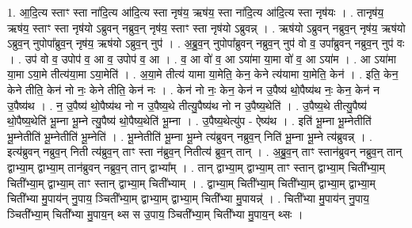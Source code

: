 \documentclass[17pt]{extarticle}
\begin{document}
1. आ॒दि॒त्य स्ताꣳ स्ता ना॑दि॒त्य आ॑दि॒त्य स्ता नृष॑य॒ ऋष॑य॒ स्ता ना॑दि॒त्य आ॑दि॒त्य स्ता नृष॑यः । . तानृष॑य॒ ऋष॑य॒ स्ताꣳ स्ता नृष॑यो ऽब्रुवन् नब्रुव॒न् नृष॑य॒ स्ताꣳ स्ता नृष॑यो ऽब्रुवन्न् । . ऋष॑यो ऽब्रुवन् नब्रुव॒न् नृष॑य॒ ऋष॑यो ऽब्रुव॒न् नुपोपा᳚ब्रुव॒न् नृष॑य॒ ऋष॑यो ऽब्रुव॒न् नुप॑ । . अ॒ब्रु॒व॒न् नुपोपा᳚ब्रुवन् नब्रुव॒न् नुप॑ वो व॒ उपा᳚ब्रुवन् नब्रुव॒न् नुप॑ वः । . उप॑ वो व॒ उपोप॑ व॒ आ व॒ उपोप॑ व॒ आ । . व॒ आ वो॑ व॒ आ ऽया॑मा या॒मा वो॑ व॒ आ ऽया॑म । . आ ऽया॑मा या॒मा ऽया॒मे तीत्य॑या॒मा ऽया॒मेति॑ । . अ॒या॒मे तीत्य॑ यामा या॒मेति॒ केन॒ केने त्य॑यामा या॒मेति॒ केन॑ । . इति॒ केन॒ केने तीति॒ केन॑ नो नः॒ केने तीति॒ केन॑ नः । . केन॑ नो नः॒ केन॒ केन॑ न उ॒पैष्य॑ थो॒पैष्य॑थ नः॒ केन॒ केन॑ न उ॒पैष्य॑थ । . न॒ उ॒पैष्य॑ थो॒पैष्य॑थ नो न उ॒पैष्य॒थे तीत्यु॒पैष्य॑थ नो न उ॒पैष्य॒थेति॑ । . उ॒पैष्य॒थे तीत्यु॒पैष्य॑ थो॒पैष्य॒थेति॑ भू॒म्ना भू॒म्ने त्यु॒पैष्य॑ थो॒पैष्य॒थेति॑ भू॒म्ना । . उ॒पैष्य॒थेत्यु॑प - ऐष्य॑थ । . इति॑ भू॒म्ना भू॒म्नेतीति॑ भू॒म्नेतीति॑ भू॒म्नेतीति॑ भू॒म्नेति॑ । . भू॒म्नेतीति॑ भू॒म्ना भू॒म्ने त्य॑ब्रुवन् नब्रुव॒न् निति॑ भू॒म्ना भू॒म्ने त्य॑ब्रुवन्न् । . इत्य॑ब्रुवन् नब्रुव॒न् निती त्य॑ब्रुव॒न् ताꣳ स्ता न॑ब्रुव॒न् नितीत्य॑ ब्रुव॒न् तान् । . अ॒ब्रु॒व॒न् ताꣳ स्तान॑ब्रुवन् नब्रुव॒न् तान् द्वाभ्या॒म् द्वाभ्या॒म् तान॑ब्रुवन् नब्रुव॒न् तान् द्वाभ्या᳚म् । . तान् द्वाभ्या॒म् द्वाभ्या॒म् ताꣳ स्तान् द्वाभ्या॒म् चिती᳚भ्या॒म् चिती᳚भ्या॒म् द्वाभ्या॒म् ताꣳ स्तान् द्वाभ्या॒म् चिती᳚भ्याम् । . द्वाभ्या॒म् चिती᳚भ्या॒म् चिती᳚भ्या॒म् द्वाभ्या॒म् द्वाभ्या॒म् चिती᳚भ्या मु॒पाय॑न् नु॒पाय॒ ञ्चिती᳚भ्या॒म् द्वाभ्या॒म् द्वाभ्या॒म् चिती᳚भ्या मु॒पायन्न्॑ । . चिती᳚भ्या मु॒पाय॑न् नु॒पाय॒ ञ्चिती᳚भ्या॒म् चिती᳚भ्या मु॒पाय॒न् थ्स स उ॒पाय॒ ञ्चिती᳚भ्या॒म् चिती᳚भ्या मु॒पाय॒न् थ्सः । \newline
\end{document}
